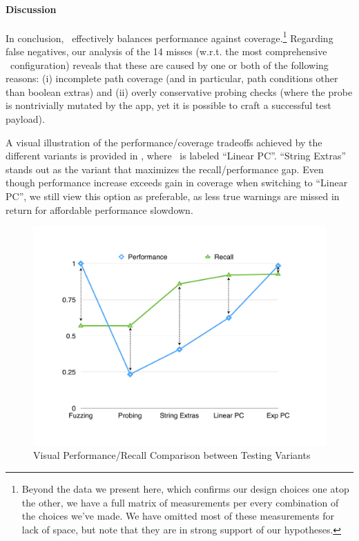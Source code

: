 \paragraph{Discussion} In conclusion, \Tool\ effectively balances performance against coverage.\footnote{
	Beyond the data we present here, which confirms our design choices one atop the other, we have a full matrix of measurements per every combination of the choices we've made. We have omitted most of these measurements for lack of space, but note that they are in strong support of our hypotheses.
} Regarding false negatives, our analysis of the 14 misses (w.r.t. the most comprehensive \Tool\ configuration) reveals that these are caused by one or both of the following reasons: (i) incomplete path coverage (and in particular, path conditions other than boolean extras) and (ii) overly conservative probing checks (where the probe is nontrivially mutated by the app, yet it is possible to craft a successful test payload).

A visual illustration of the performance/coverage tradeoffs achieved by the different variants is provided in , where \Tool\ is labeled ``Linear PC''.
%
``String Extras'' stands out as the variant that maximizes the recall/performance gap. Even though performance increase exceeds gain in coverage when switching to ``Linear PC'', we still view this option as preferable, as less true warnings are missed in return for affordable performance slowdown.

\begin{figure}
	\includegraphics[width=\columnwidth]{trendline.pdf}
	\caption{\label{Fi:trends}Visual Performance/Recall Comparison between Testing Variants}
\end{figure}



